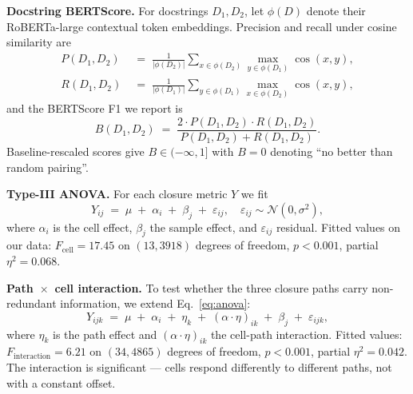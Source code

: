 
\textbf{Docstring BERTScore.} For docstrings $D_1, D_2$, let $\phi(D)$
denote their RoBERTa-large contextual token embeddings. Precision and
recall under cosine similarity are
\begin{align}
  P(D_1, D_2) &\;=\; \frac{1}{|\phi(D_2)|} \sum_{x \in \phi(D_2)} \max_{y \in \phi(D_1)} \cos(x, y), \label{eq:bert_p}\\
  R(D_1, D_2) &\;=\; \frac{1}{|\phi(D_1)|} \sum_{y \in \phi(D_1)} \max_{x \in \phi(D_2)} \cos(x, y), \label{eq:bert_r}
\end{align}
and the BERTScore F1 we report is
\begin{equation}
  B(D_1, D_2)
  \;=\;
  \frac{2 \cdot P(D_1, D_2) \cdot R(D_1, D_2)}{P(D_1, D_2) + R(D_1, D_2)}.
  \label{eq:bertscore}
\end{equation}
Baseline-rescaled scores give $B \in (-\infty, 1]$ with $B = 0$ denoting
``no better than random pairing''.


\textbf{Type-III ANOVA.} For each closure metric $Y$ we fit
\begin{equation}
  Y_{ij} \;=\; \mu \;+\; \alpha_i \;+\; \beta_j \;+\; \varepsilon_{ij},
  \quad \varepsilon_{ij} \sim \mathcal{N}(0, \sigma^2),
  \label{eq:anova}
\end{equation}
where $\alpha_i$ is the cell effect, $\beta_j$ the sample effect, and
$\varepsilon_{ij}$ residual. Fitted values on our data: $F_{\text{cell}} =
17.45$ on $(13, 3918)$ degrees of freedom, $p < 0.001$, partial $\eta^2 =
0.068$.


\textbf{Path~$\times$~cell interaction.} To test whether the three closure
paths carry non-redundant information, we extend Eq.~\ref{eq:anova}:
\begin{equation}
  Y_{ijk} \;=\; \mu \;+\; \alpha_i \;+\; \eta_k \;+\; (\alpha \cdot \eta)_{ik} \;+\; \beta_j \;+\; \varepsilon_{ijk},
  \label{eq:anova_interact}
\end{equation}
where $\eta_k$ is the path effect and $(\alpha \cdot \eta)_{ik}$ the
cell-path interaction. Fitted values: $F_{\text{interaction}} = 6.21$ on
$(34, 4865)$ degrees of freedom, $p < 0.001$, partial $\eta^2 = 0.042$.
The interaction is significant --- cells respond differently to different
paths, not with a constant offset.

